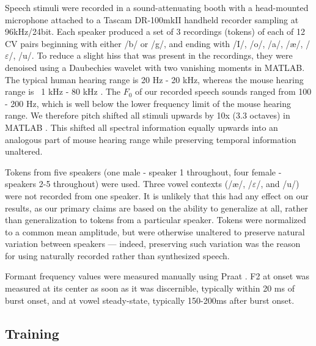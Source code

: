 \documentclass[11pt]{article}\usepackage[]{graphicx}\usepackage[]{color}
\begin{document}
Speech stimuli were recorded in a sound-attenuating booth with a head-mounted microphone attached to a Tascam DR-100mkII handheld recorder sampling at 96kHz/24bit. Each speaker produced a set of 3 recordings (tokens) of each of 12 CV pairs beginning with either /b/ or /g/, and ending with /I/, /o/, /a/, /\ae/, /$\varepsilon$/, /u/. To reduce a slight hiss that was present in the recordings, they were denoised using a Daubechies wavelet with two vanishing moments in MATLAB. The typical human hearing range is 20 Hz - 20 kHz, whereas the mouse hearing range is ~1 kHz - 80 kHz \cite{Radziwon2009}. The $F_0$ of our recorded speech sounds ranged from 100 - 200 Hz, which is well below the lower frequency limit of the mouse hearing range. We therefore pitch shifted all stimuli upwards by 10x (3.3 octaves) in MATLAB \cite{Mathworks}. This shifted all spectral information equally upwards into an analogous part of mouse hearing range while preserving temporal information unaltered.

Tokens from five speakers (one male - speaker 1 throughout, four female - speakers 2-5 throughout) were used. Three vowel contexts (/\ae/, /$\varepsilon$/, and /u/) were not recorded from one speaker. It is unlikely that this had any effect on our results, as our primary claims are based on the ability to generalize at all, rather than generalization to tokens from a particular speaker. Tokens were normalized to a common mean amplitude, but were otherwise unaltered to preserve natural variation between speakers --- indeed, preserving such variation was the reason for using naturally recorded rather than synthesized speech.

Formant frequency values were measured manually using Praat \cite{Boersma2001}. F2 at onset was measured at its center as soon as it was discernible, typically within 20 ms of burst onset, and at vowel steady-state, typically 150-200ms after burst onset.

\subsection{Training}
\end{document}
